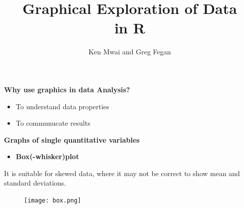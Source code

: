 \documentclass[xcolor=dvipsnames , 11pt]{beamer}
\begin{document}



\title{\textbf{Graphical Exploration of Data \\
in R}}
\author{Ken Mwai and Greg Fegan}
\titlepage{}

\begin{frame}{\textbf{Why use graphics in data Analysis?}}

\begin{itemize}
\item{To understand data properties}
\item{To communucate results}
\end{itemize}
\end{frame}



\begin{frame}{\textbf{Graphs of single quantitative variables}}
\begin{itemize}
\item{\textbf{Box(-whisker)plot}}
\end{itemize}
It is suitable for skewed data, where it may not be correct to show mean and standard deviations.
\begin{figure}
\texttt{[image: box.png]}
\end{figure}

\end{frame}
\end{document}
